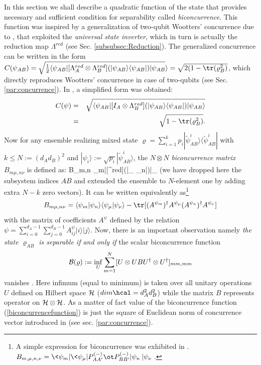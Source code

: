 \documentclass[rmp,12pt,preprint]{revtex4-2}
\begin{document}
In this section we shall describe a quadratic function of the state
that provides necessary and sufficient condition for separability
called {\it biconcurrence}. This function was inspired by a
generalization of two-qubit Wootters' concurrence due to
\cite{RungtaBCHM2001-concurrence}, that exploited the {\it universal
  state inverter}, which in turn is actually the reduction map
$\Lambda^{red}$ (see Sec. \ref{subsubsec:Reduction}). The generalized
concurrence can be written in the form $C(\psi_{AB})= \sqrt{{1\over 2}\langle
\psi_{AB}|[\Lambda^{red}_{A} \otimes
\Lambda^{red}_{B}](|\psi_{AB}\rangle \langle \psi_{AB}|)|\psi_{AB}}
\rangle=\sqrt{2(1-{\tr}(\varrho_{B}^{2})}$, which directly reproduces
Wootters' concurrence in case of two-qubits (see Sec. \ref{par:concurrence}). In
\cite{BadziagDHHH01-conc}, a simplified form was obtained:
\begin{eqnarray}
C(\psi)&=&\sqrt{\langle \psi_{AB}|[I_{A} \otimes
\Lambda^{red}_{B}](|\psi_{AB}\rangle \langle \psi_{AB}|)|\psi_{AB}
\rangle }\nonumber\\
&=&\sqrt{1-{\tr}(\varrho_{B}^{2})}.
\end{eqnarray}
Now for any ensemble realizing mixed state $\varrho=\sum_{i=1}^{k}
p_{i}|\tilde{\psi}_{AB}^{i}\rangle \langle \tilde{\psi}_{AB}^{i}|$
with $k \leq N:=(d_{A}d_{B})^{2}$ and
$|\psi_{i}\rangle:=\sqrt{p_{i}}|\tilde{\psi}_{AB}^{i}\rangle $, the
$N \otimes N$ {\it biconcurrence matrix} $B_{m\mu,n\nu}$ is defined as:
\be
B_{m\mu,n\nu} \equiv \langle
\psi_{m}|[\id \otimes \Lambda^{red}](|\psi_{\mu}\rangle \langle
\psi_{n}|)|\psi_{\nu} \rangle
\label{biconcurrencematrix}
\ee
(we have dropped here the subsystem indices $AB$ and extended the
ensemble to $N$-element one by adding extra $N-k$ zero vectors). It
can be written equivalently as\footnote{A simple expression for biconcurrence was
  exhibited in \cite{MintertKB04-conc}.
  $B_{m,\mu,n,\nu}=\<\psi_m|\<\psi_\mu| P^{(-)}_{AA'}\ot P^{(-)}_{BB'}
  |\psi_n\>|\psi_\nu\>$.}
\begin{equation}
B_{m \mu,n \nu}=\langle \psi_m|\psi_n \rangle
\langle\psi_\mu|\psi_\nu \rangle -
 {\tr}[(A^{\psi_{m}})^{\dagger}A^{\psi_{\mu}}
(A^{\psi_{n}})^{\dagger}A^{\psi_{\nu}}]
\label{eq:bicon-latwe}
\end{equation}
with the matrix of coefficients $A^{\psi}$ defined by the relation
$\psi=\sum_{i=0}^{d_{A}-1}\sum_{j=0}^{d_{B}-1}
A^{\psi}_{ij}|i\rangle|j\rangle $. Now, there is an important
observation namely {\it the state $\varrho_{AB}$ is separable if and
only if} the scalar biconcurrence function
\begin{equation}
{\cal B}(\varrho):=\inf_{U} \sum_{m=1}^N[U \otimes U B U^{\dagger}
\otimes U^{\dagger}]_{mm,mm} \label{biconcurrencefunction}
\end{equation}
vanishes \cite{BadziagDHHH01-conc}. Here infimum (equal to minimum) is
taken over all unitary operations $U$ defined on Hilbert space ${\cal
  H}$ ($dim \hcal = d_{A}^{2}d_{B}^{2}$) while the matrix $B$
represents operator on ${\cal H} \otimes {\cal H}$.
As a matter of fact value of the biconcurrence function
(\ref{biconcurrencefunction}) is just the
square of Euclidean norm of concurrence vector introduced  in
\cite{AudenaertVM2000-concurrence} (see sec. \ref{par:concurrence}).
\end{document}
